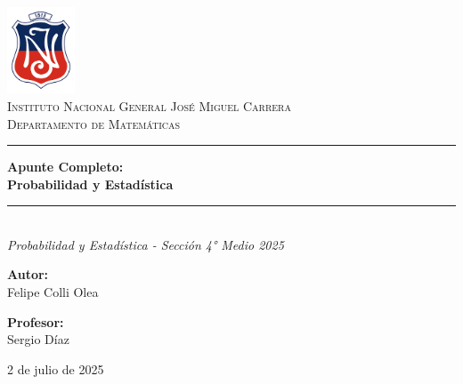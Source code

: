 \documentclass[12pt, letterpaper]{article}
\begin{document}
\begin{titlepage}
    \centering
    \includegraphics[width=2cm]{IN}\\[2cm] 
    \textsc{\LARGE  Instituto Nacional General José Miguel Carrera}\\[0.5cm]
    \textsc{\Large Departamento de Matemáticas}\\[1.5cm] %
    
    \rule{\textwidth}{1.5pt}\vspace{0.4cm}
    {\Huge \bfseries Apunte Completo: \\[0.5cm] Probabilidad y Estadística}\\[0.4cm] %
    \rule{\textwidth}{1.5pt}\\[1.5cm]
    
    {\Large \textit{ Probabilidad y Estadística - Sección 4° Medio 2025}}\\[2cm] %
    
    \begin{minipage}{0.45\textwidth}
        \begin{flushleft} \large
            \textbf{Autor:}\\ 
            Felipe Colli Olea
        \end{flushleft}
    \end{minipage}
    \hfill
    \begin{minipage}{0.45\textwidth}
        \begin{flushright} \large
            \textbf{Profesor:}\\
            Sergio Díaz
        \end{flushright}
    \end{minipage}

    \vfill
    
    {\large 2 de julio de 2025}
\end{titlepage}
\end{document}
